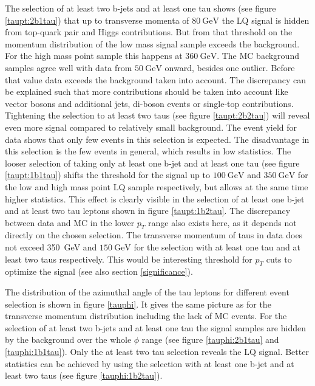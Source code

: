 %
The selection of at least two b-jets and at least one tau shows (see figure \ref{taupt:2b1tau}) that up to transverse momenta of $\SI{80}{\giga\electronvolt}$ the LQ signal is hidden from top-quark pair and Higgs contributions. But from that threshold on the momentum distribution of the low mass signal sample exceeds the background. For the high mass point sample this happens at $\SI{360}{\giga\electronvolt}$. The MC background samples agree well with data from $\SI{50}{\giga\electronvolt}$ onward, besides one outlier. Before that value data exceeds the background taken into account. The discrepancy can be explained such that more contributions should be taken into account like vector bosons and additional jets, di-boson events or single-top contributions. Tightening the selection to at least two taus (see figure \ref{taupt:2b2tau}) will reveal even more signal compared to relatively small background. The event yield for data shows that only few events in this selection is expected. The disadvantage in this selection is the few events in general, which results in low statistics. The looser selection of taking only at least one b-jet and at least one tau (see figure \ref{taupt:1b1tau}) shifts the threshold for the signal up to $\SI{100}{\giga\electronvolt}$ and $\SI{350}{\giga\electronvolt}$ for the low and high mass point LQ sample respectively, but allows at the same time higher statistics. This effect is clearly visible in the selection of at least one b-jet and at least two tau leptons shown in figure \ref{taupt:1b2tau}. The discrepancy between data and MC in the lower $p_T$ range also exists here, as it depends not directly on the chosen selection. The transverse momentum of taus in data does not exceed \SI{350}{\giga\electronvolt} and $\SI{150}{\giga\electronvolt}$ for the selection with at least one tau and at least two taus respectively. This would be interesting threshold for $p_T$ cuts to optimize the signal (see also section \ref{significance}).\par
The distribution of the azimuthal angle of the tau leptons for different event selection is shown in figure \ref{tauphi}. It gives the same picture as for the transverse momentum distribution including the lack of MC events. For the selection of at least two b-jets and at least one tau the signal samples are hidden by the background over the whole $\phi$ range (see figure \ref{tauphi:2b1tau} and \ref{tauphi:1b1tau}). Only the at least two tau selection reveals the LQ signal. Better statistics can be achieved by using the selection with at least one b-jet and at least two taus (see figure \ref{tauphi:1b2tau}).\par
